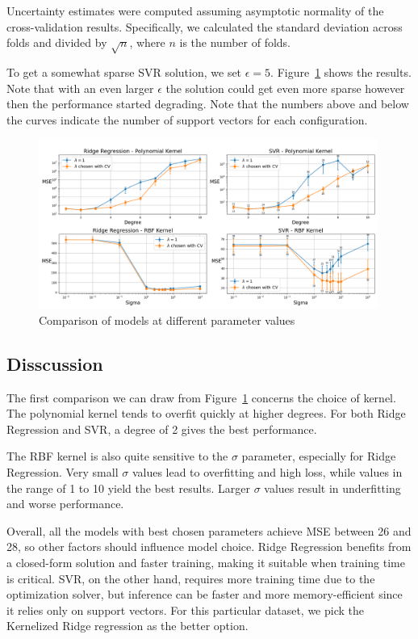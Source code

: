 \documentclass[9pt]{IEEEtran}
\begin{document}
Uncertainty estimates were computed assuming asymptotic normality of 
the cross-validation results. Specifically, we calculated the standard 
deviation across folds and divided by \(\sqrt{n}\), where \(n\) is 
the number of folds.

To get a somewhat sparse SVR solution, we set \(\epsilon = 5\).  
Figure~\ref{fig:part2} shows the results. Note that with an even larger $\epsilon$ 
the solution could get even more sparse however then the performance started degrading.
 Note that the numbers above and below the 
curves indicate the number of support vectors for each configuration.


\vspace{30pt}
\begin{figure}[H]
    \centering
    \includegraphics[width=0.99\textwidth]{figures/part2.png}
    \caption{Comparison of models at different parameter values}
    \label{fig:part2}
\end{figure}


\newpage
\subsection{Disscussion}
The first comparison we can draw from Figure~\ref{fig:part2} concerns 
the choice of kernel. The polynomial kernel tends to overfit quickly
 at higher degrees. For both Ridge Regression and SVR, a degree of 2
  gives the best performance. 

The RBF kernel is also quite sensitive to the \(\sigma\) parameter, 
especially for Ridge Regression. Very small \(\sigma\) values lead to 
overfitting and high loss, while values in the range of 1 to 10 yield
 the best results. Larger \(\sigma\) values result in underfitting and 
 worse performance.

Overall, all the models with best chosen parameters
 achieve MSE between 26 and 28, so other factors 
should influence model choice. Ridge Regression benefits from a closed-form 
solution and faster training, making it suitable when training time is 
critical. SVR, on the other hand, requires more training time due to the
 optimization solver, but inference can be faster and more memory-efficient 
 since it relies only on support vectors. For this particular dataset, we pick 
 the Kernelized Ridge regression as the better option. 
\end{document}
